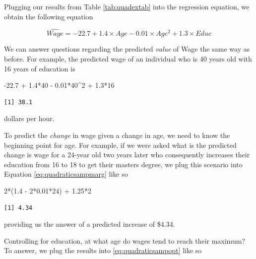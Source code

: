 \documentclass[
]{book}
\makeatletter
\newenvironment{Shaded}{\begin{snugshade}}{\end{snugshade}}
\newcommand{\DecValTok}[1]{\textcolor[rgb]{0.06,0.06,0.06}{#1}}
\newcommand{\FloatTok}[1]{\textcolor[rgb]{0.06,0.06,0.06}{#1}}
\newcommand{\NormalTok}[1]{#1}
\newcommand{\SpecialCharTok}[1]{\textcolor[rgb]{0,0,0}{#1}}
\newenvironment{kframe}{%
\medskip{}
\setlength{\fboxsep}{.8em}
 \def\at@end@of@kframe{}%
 \ifinner\ifhmode%
  \def\at@end@of@kframe{\end{minipage}}%
  \begin{minipage}{\columnwidth}%
 \fi\fi%
 \def\FrameCommand##1{\hskip\@totalleftmargin \hskip-\fboxsep
 \colorbox{shadecolor}{##1}\hskip-\fboxsep
     \hskip-\linewidth \hskip-\@totalleftmargin \hskip\columnwidth}%
 \MakeFramed {\advance\hsize-\width
   \@totalleftmargin\z@ \linewidth\hsize
   \@setminipage}}%
 {\par\unskip\endMakeFramed%
 \at@end@of@kframe}
\renewenvironment{Shaded}{\begin{kframe}}{\end{kframe}}
\makeatother
\begin{document}
Plugging our results from Table \ref{tab:quadextab} into the regression equation, we obtain the following equation

\begin{equation}
\hat{Wage} = -22.7 + 1.4\times Age - 0.01\times Age^2 + 1.3\times Educ
\label{eq:quadraticexsamp}
\end{equation}

We can answer questions regarding the predicted \emph{value} of Wage the same way as before. For example, the predicted wage of an individual who is 40 years old with 16 years of education is

\begin{Shaded}
\begin{Highlighting}[]
\SpecialCharTok{{-}}\FloatTok{22.7} \SpecialCharTok{+} \FloatTok{1.4}\SpecialCharTok{*}\DecValTok{40} \SpecialCharTok{{-}} \FloatTok{0.01}\SpecialCharTok{*}\DecValTok{40}\SpecialCharTok{\^{}}\DecValTok{2} \SpecialCharTok{+} \FloatTok{1.3}\SpecialCharTok{*}\DecValTok{16}
\end{Highlighting}
\end{Shaded}

\begin{verbatim}
[1] 38.1
\end{verbatim}

dollars per hour.

To predict the \emph{change} in wage given a change in age, we need to know the beginning point for age. For example, if we were asked what is the predicted change is wage for a 24-year old two years later who consequently increases their education from 16 to 18 to get their masters degree, we plug this scenario into Equation \eqref{eq:quadraticsampmarg} like so

\begin{Shaded}
\begin{Highlighting}[]
\DecValTok{2}\SpecialCharTok{*}\NormalTok{(}\FloatTok{1.4} \SpecialCharTok{{-}} \DecValTok{2}\SpecialCharTok{*}\FloatTok{0.01}\SpecialCharTok{*}\DecValTok{24}\NormalTok{) }\SpecialCharTok{+} \FloatTok{1.25}\SpecialCharTok{*}\DecValTok{2}
\end{Highlighting}
\end{Shaded}

\begin{verbatim}
[1] 4.34
\end{verbatim}

providing us the answer of a predicted increase of \$4.34.

Controlling for education, at what age do wages tend to reach their maximum? To answer, we plug the results into \eqref{eq:quadraticsampopt} like so
\end{document}
